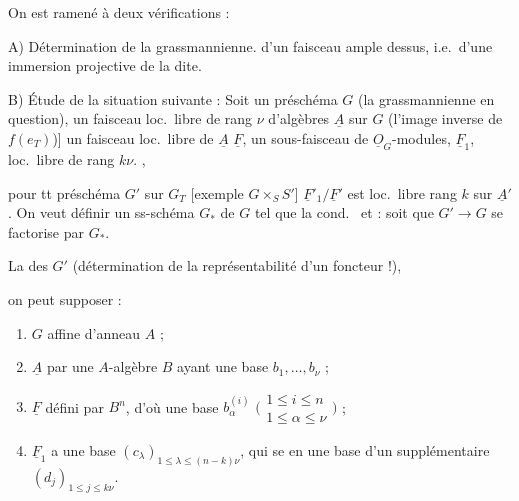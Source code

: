 \documentclass[11pt,a4paper]{article}
\begin{document}
On est ramené \struck{\ill{}} à deux vérifications :

A) Détermination de la grassmannienne.
 d'un faisceau ample dessus, i.e.\ d'une
immersion projective de la dite.


B) Étude de la situation suivante : Soit un
préschéma $G$ (la grassmannienne en question),
un faisceau loc.\ libre de rang $\nu$ d'algèbres
$\underline{A}$ sur $G$ (l'image inverse de $f(e_T)$)]
un faisceau loc.\ libre de $\underline{A}$ \struck{\ill{}} 
$\underline{F}$, un sous-faisceau de $\underline{O}_G$\struck{\ill{}}-modules,
 $\underline{F}_1$, loc.\ libre
de rang $k\nu$. ,

pour tt préschéma $G'$ sur $G_T$ [exemple $G\times_S S'$]
\ill{}   $\underline{F}'_1/\underline{F}'$ est loc.\ libre 
rang $k$ sur $\underline{A}'$. On veut
définir un ss-schéma \struck{\ill{}} $G_{*}$ de $G$ tel
que la cond.\ \ill{} et \ill{} \ill{} :
soit que $G'\to G$ se factorise par $G_{*}$.

La   des \ill{} $G'$ (détermination
de la représentabilité d'un foncteur !),

on peut supposer :
\begin{enumerate}
  \item[(i)] $G$ affine d'anneau $A$ ;
  \item[(ii)] $\underline{A}$  par une $A$-algèbre $B$ ayant une
  base $b_1,\dots,b_\nu$ ;
  \item[(iii)] $\underline{F}$ défini par $B^{n}$, d'où une base
  $b^{(i)}_{\alpha}$ $\bigl(\begin{smallmatrix}1\le i\le n\\ 1\le\alpha\le\nu\end{smallmatrix}\bigr)$ ;
  \item[(iv)] $\underline{F}_1$ a une base \struck{\ill{}} $(c_\lambda)_{1\le\lambda\le(n-k)\nu}$, qui se
   en une base \ill{} d'un
  supplémentaire $(d_j)_{1\le j\le k\nu}$.
\end{enumerate}
\end{document}

